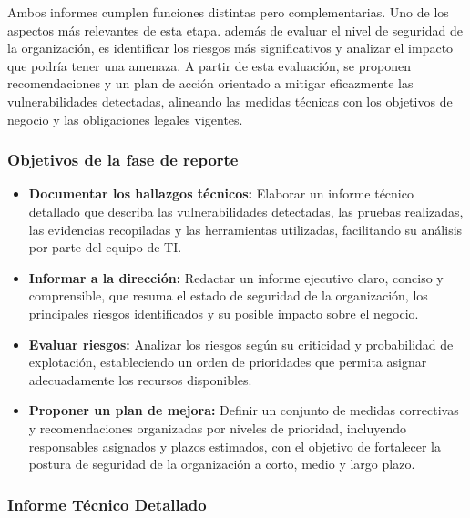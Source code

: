 \documentclass[a4paper, 11pt]{article}
\begin{document}
\par\vspace{0.5cm}

Ambos informes cumplen funciones distintas pero complementarias. Uno de los aspectos más relevantes de esta etapa. además de evaluar el nivel de seguridad de la organización, 
es identificar los riesgos más significativos y analizar el impacto que podría tener una amenaza. A partir de esta evaluación, se proponen recomendaciones y un plan de acción orientado a mitigar eficazmente las vulnerabilidades detectadas, alineando las medidas técnicas con los objetivos de negocio y las obligaciones legales vigentes.
\par\vspace{0.5cm}

\subsubsection*{Objetivos de la fase de reporte}
\begin{itemize}
\item \textbf{Documentar los hallazgos técnicos:} Elaborar un informe técnico detallado que describa las vulnerabilidades detectadas, las pruebas realizadas, las evidencias recopiladas y las herramientas utilizadas, facilitando su análisis por parte del equipo de TI.

\item \textbf{Informar a la dirección:} Redactar un informe ejecutivo claro, conciso y comprensible, que resuma el estado de seguridad de la organización, los principales riesgos identificados y su posible impacto sobre el negocio.

\item \textbf{Evaluar riesgos:} Analizar los riesgos según su criticidad y probabilidad de explotación, estableciendo un orden de prioridades que permita asignar adecuadamente los recursos disponibles.

\item \textbf{Proponer un plan de mejora:} Definir un conjunto de medidas correctivas y recomendaciones organizadas por niveles de prioridad, incluyendo responsables asignados y plazos estimados, con el objetivo de fortalecer la postura de seguridad de la organización a corto, medio y largo plazo.
\end{itemize}
\vspace{0.5cm}



\subsubsection{Informe Técnico Detallado}
\end{document}
